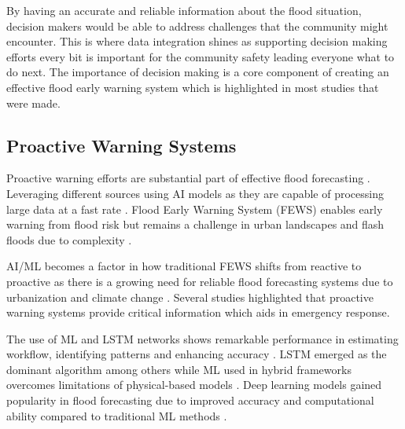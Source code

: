 \documentclass{research}
\begin{document}
By having an accurate and reliable information about the flood situation, decision makers 
would be able to address challenges that the community might encounter. This is where data integration shines 
as supporting decision making efforts every bit
is important for the community safety leading everyone what to do next. The importance
of decision making is a core component of creating an effective flood  early warning system which is highlighted
in most studies that were made. 

\subsection*{Proactive Warning Systems}

Proactive warning efforts are substantial part of effective flood forecasting \cite{Fang_Johnson_Sankarasubramanian_2024}.
Leveraging different sources using AI models as they are capable of processing large data at a fast rate \cite{demelo2024early,zlopasa2024leveraging}. 
Flood Early Warning System (FEWS) enables early warning from flood risk but remains a challenge in urban landscapes \cite{hofmann2020risk,lee2020integrated,palash2024datadriven} 
and flash floods due to complexity \cite{soares2025ml4ff}.

AI/ML becomes a factor in how traditional FEWS shifts from reactive to proactive \cite{alrawas2024critical,piadeh2022critical} 
as there is a growing need for reliable flood forecasting systems due to urbanization and 
climate change \cite{fernandeznovoa2024enhancing,hossoda2025datadriven,oddo2024deep}. Several studies \cite{lee2023maxfloodcast,alasali2021sustainable,najafi2024high} 
highlighted that proactive warning systems provide critical information which aids in emergency response.

The use of ML and LSTM networks shows remarkable performance in estimating workflow, 
identifying patterns and enhancing accuracy \cite{nevo2022flood,khan2025development,aravamudan2025superresolution}. 
LSTM emerged as the dominant algorithm \cite{kuhaneswaran2025evolution} among others while 
ML used in hybrid frameworks overcomes limitations of physical-based models \cite{li2024optimizing,refadah2025development}. 
Deep learning models gained popularity in flood forecasting due to improved accuracy and computational ability compared to traditional ML 
methods \cite{situ2024improving,yi2024reservoir}.
\end{document}
